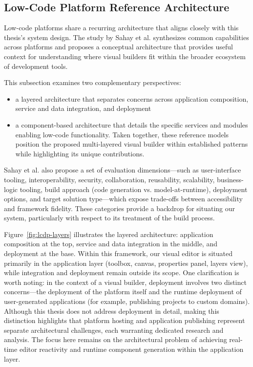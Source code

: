 \documentclass[oneside,12pt]{book}
\begin{document}
\subsection{Low-Code Platform Reference Architecture}

Low-code platforms share a recurring architecture that aligns closely with this thesis's system design. The study by Sahay et al. \cite{sahay2020supporting} synthesizes common capabilities across platforms and proposes a conceptual architecture that provides useful context for understanding where visual builders fit within the broader ecosystem of development tools.

This subsection examines two complementary perspectives: 

\begin{itemize}
\item a layered architecture that separates concerns across application composition, service and data integration, and deployment  
\item a component-based architecture that details the specific services and modules enabling low-code functionality. Taken together, these reference models position the proposed multi-layered visual builder within established patterns while highlighting its unique contributions.
\end{itemize}

\newpage

Sahay et al. also propose a set of evaluation dimensions—such as user-interface tooling, interoperability, security, collaboration, reusability, scalability, business-logic tooling, build approach (code generation vs. model-at-runtime), deployment options, and target solution type—which expose trade-offs between accessibility and framework fidelity. These categories provide a backdrop for situating our system, particularly with respect to its treatment of the build process.

Figure~\ref{fig:lcdp-layers} illustrates the layered architecture: application composition at the top, service and data integration in the middle, and deployment at the base. Within this framework, our visual editor is situated primarily in the application layer (toolbox, canvas, properties panel, layers view), while integration and deployment remain outside its scope. One clarification is worth noting: in the context of a visual builder, deployment involves two distinct concerns—the deployment of the platform itself and the runtime deployment of user-generated applications (for example, publishing projects to custom domains). Although this thesis does not address deployment in detail, making this distinction highlights that platform hosting and application publishing represent separate architectural challenges, each warranting dedicated research and analysis. The focus here remains on the architectural problem of achieving real-time editor reactivity and runtime component generation within the application layer.
\end{document}
